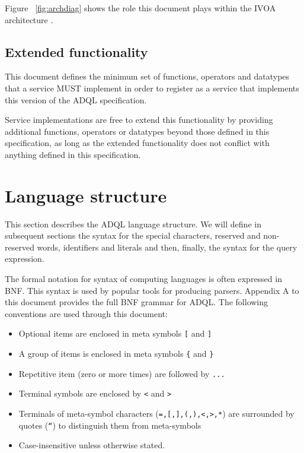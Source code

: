 \documentclass[11pt,a4paper]{ivoa}
\begin{document}
Figure ~\ref{fig:archdiag} shows the role this document plays within the
IVOA architecture \citep{note:VOARCH}.

\subsection{Extended functionality}
\label{sec:extending}

This document defines the minimum set of functions, operators and datatypes
that a service MUST implement in order to register as a service that
implements this version of the ADQL specification.

Service implementations are free to extend this functionality by providing
additional functions, operators or datatypes beyond those defined in this
specification, as long as the extended functionality does not conflict
with anything defined in this specification.
\clearpage
\section{Language structure}
\label{sec:language}

This section describes the ADQL language structure. We will define in
subsequent sections the syntax for the special characters, reserved and non-
reserved words, identifiers and literals and then, finally, the syntax for
the query expression.

The formal notation for syntax of computing languages is often expressed
in BNF. This syntax is used by popular tools for
producing parsers. Appendix A to this document provides the full BNF grammar
for ADQL. The following conventions are used through this document:

\begin{itemize}
    \item Optional items are enclosed in meta symbols \verb:[: and \verb:]:
    \item A group of items is enclosed in meta symbols \verb:{: and \verb:}:
    \item Repetitive item (zero or more times) are followed by \verb:...:
    \item Terminal symbols are enclosed by \verb:<: and \verb:>:
    \item Terminals of meta-symbol characters (\verb:=,[,],(,),<,>,*:) are surrounded by quotes (\verb:“:) to distinguish them from meta-symbols
    \item Case-insensitive unless otherwise stated.
\end{itemize}
\end{document}

